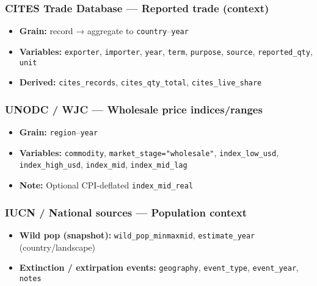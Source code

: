 \documentclass[
]{article}
\providecommand{\tightlist}{%
  \setlength{\itemsep}{0pt}\setlength{\parskip}{0pt}}
\begin{document}
\subsubsection{CITES Trade Database --- Reported trade
(context)}\label{cites-trade-database-reported-trade-context}

\begin{itemize}
\tightlist
\item
  \textbf{Grain:} record → aggregate to \texttt{country}--\texttt{year}
\item
  \textbf{Variables:} \texttt{exporter}, \texttt{importer},
  \texttt{year}, \texttt{term}, \texttt{purpose}, \texttt{source},
  \texttt{reported\_qty}, \texttt{unit}
\item
  \textbf{Derived:} \texttt{cites\_records}, \texttt{cites\_qty\_total},
  \texttt{cites\_live\_share}
\end{itemize}

\subsubsection{\texorpdfstring{UNODC / WJC --- \textbf{Wholesale price
indices/ranges}}{UNODC / WJC --- Wholesale price indices/ranges}}\label{unodc-wjc-wholesale-price-indicesranges}

\begin{itemize}
\tightlist
\item
  \textbf{Grain:} \texttt{region}--\texttt{year}
\item
  \textbf{Variables:} \texttt{commodity},
  \texttt{market\_stage="wholesale"}, \texttt{index\_low\_usd},
  \texttt{index\_high\_usd}, \texttt{index\_mid},
  \texttt{index\_mid\_lag}
\item
  \textbf{Note:} Optional CPI-deflated \texttt{index\_mid\_real}
\end{itemize}

\subsubsection{IUCN / National sources --- Population
context}\label{iucn-national-sources-population-context}

\begin{itemize}
\tightlist
\item
  \textbf{Wild pop (snapshot):}
  \texttt{wild\_pop\_min\textbar{}max\textbar{}mid},
  \texttt{estimate\_year} (country/landscape)
\item
  \textbf{Extinction / extirpation events:} \texttt{geography},
  \texttt{event\_type}, \texttt{event\_year}, \texttt{notes}
\end{itemize}
\end{document}

